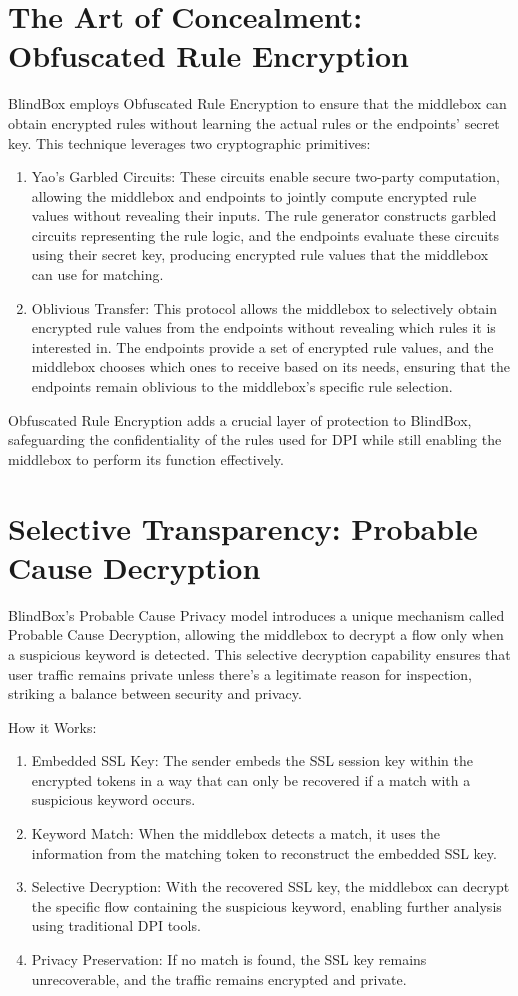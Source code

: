 \documentclass[conference]{IEEEtran}
\begin{document}
\section{The Art of Concealment: Obfuscated Rule Encryption}
BlindBox employs Obfuscated Rule Encryption to ensure that the middlebox can obtain encrypted rules without learning the actual rules or the endpoints' secret key. This technique leverages two cryptographic primitives:
\begin{enumerate}
    \item Yao's Garbled Circuits: These circuits enable secure two-party computation, allowing the middlebox and endpoints to jointly compute encrypted rule values without revealing their inputs. The rule generator constructs garbled circuits representing the rule logic, and the endpoints evaluate these circuits using their secret key, producing encrypted rule values that the middlebox can use for matching.

    \item Oblivious Transfer: This protocol allows the middlebox to selectively obtain encrypted rule values from the endpoints without revealing which rules it is interested in. The endpoints provide a set of encrypted rule values, and the middlebox chooses which ones to receive based on its needs, ensuring that the endpoints remain oblivious to the middlebox's specific rule selection.
\end{enumerate}
Obfuscated Rule Encryption adds a crucial layer of protection to BlindBox, safeguarding the confidentiality of the rules used for DPI while still enabling the middlebox to perform its function effectively.

\section{Selective Transparency: Probable Cause Decryption}

BlindBox's Probable Cause Privacy model introduces a unique mechanism called Probable Cause Decryption, allowing the middlebox to decrypt a flow only when a suspicious keyword is detected. This selective decryption capability ensures that user traffic remains private unless there's a legitimate reason for inspection, striking a balance between security and privacy.

How it Works:
\begin{enumerate}
    \item Embedded SSL Key: The sender embeds the SSL session key within the encrypted tokens in a way that can only be recovered if a match with a suspicious keyword occurs.
    \item Keyword Match: When the middlebox detects a match, it uses the information from the matching token to reconstruct the embedded SSL key.
    \item Selective Decryption: With the recovered SSL key, the middlebox can decrypt the specific flow containing the suspicious keyword, enabling further analysis using traditional DPI tools.
    \item Privacy Preservation: If no match is found, the SSL key remains unrecoverable, and the traffic remains encrypted and private. 
\end{enumerate}
\end{document}
